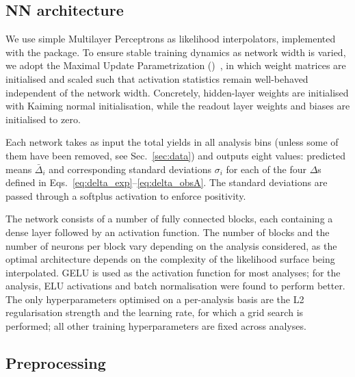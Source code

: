 \subsection{NN architecture}

We use simple Multilayer Perceptrons as likelihood interpolators, implemented
with the \pytorch package. To ensure stable training dynamics as network width
is varied, we adopt the Maximal Update Parametrization
(\mup)~\cite{Yang2021mup}, in which weight matrices are initialised and
scaled such that activation statistics remain well-behaved independent of the
network width. Concretely, hidden-layer weights are initialised with Kaiming
normal initialisation, while the readout layer weights and biases are
initialised to zero.

Each network takes as input the total yields in all analysis bins (unless some
of them have been removed, see Sec.~\ref{sec:data}) and outputs eight values:
predicted means $\bar\Delta_i$ and corresponding standard deviations
$\sigma_i$ for each of the four $\Delta$s defined in
Eqs.~\ref{eq:delta_exp}--\ref{eq:delta_obsA}. The standard deviations are
passed through a softplus activation to enforce positivity.

The network consists of a number of fully connected blocks, each containing a
dense layer followed by an activation function. The number of blocks and the
number of neurons per block vary depending on the analysis considered, as the
optimal architecture depends on the complexity of the likelihood surface being
interpolated. GELU is used as the activation function for most analyses; for
the \slepton analysis, ELU activations and batch normalisation were found to
perform better. The only hyperparameters optimised on a per-analysis basis are
the L2 regularisation strength and the learning rate, for which a grid search
is performed; all other training hyperparameters are fixed across analyses.

\subsection{Preprocessing}
\label{sec:preprocessing}

